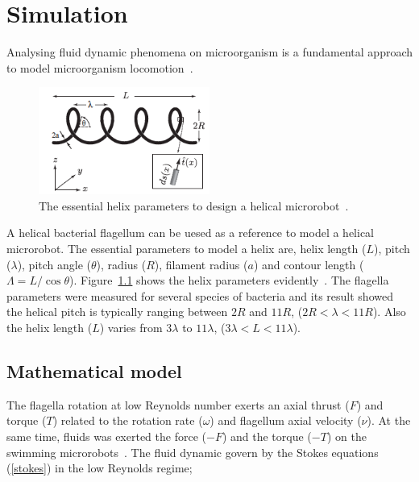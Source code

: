 \documentclass[12pt,a4paper,titlepage]{report}
\begin{document}
\chapter{Simulation}

Analysing fluid dynamic phenomena on microorganism is a fundamental approach to model microorganism
 locomotion~\citep{smith2009boundary}.


\begin{figure}
  \begin{center}
    \includegraphics[width=0.5\textwidth]{parameters}
  \caption{The essential helix parameters to design a helical microrobot~\citep{rodenborn2013propulsion}.}
  \label{parameters}
\end{center}
\end{figure}

A helical bacterial flagellum can be uesed as a reference to model a helical microrobot. The 
essential parameters to model a helix are, helix length ($L$), pitch ($\lambda$), pitch angle ($\theta$), 
radius ($R$), filament radius ($a$) and contour length ($\Lambda = L/ \cos \theta$). Figure~\ref{parameters} shows
the helix parameters evidently~\citep{rodenborn2013propulsion}. The flagella parameters were measured for
 several species of bacteria and its result showed the helical pitch is typically ranging between $2R$ and
$11R$, ($2R < \lambda < 11R$). Also the helix length ($L$) varies from $3\lambda$ to $11\lambda$, 
($3\lambda < L < 11\lambda$).


\section{Mathematical model}\label{maths}
The flagella rotation at low Reynolds number exerts an axial thrust ($F$) and torque ($T$) related to the
rotation rate ($\omega$) and flagellum axial velocity ($\nu$). At the same time, fluids was exerted the force
 ($-F$) and the torque ($-T$) on the swimming microrobots~\citep{purcell1997efficiency}. The fluid dynamic 
govern by the Stokes equations (\ref{stokes}) in the low Reynolds regime;
\end{document}
